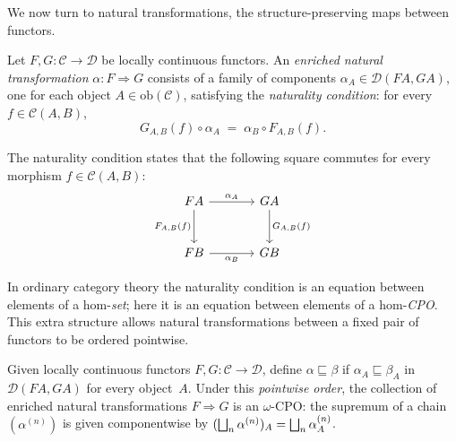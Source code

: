 We now turn to natural transformations, the structure-preserving maps
between functors.

\begin{definition}
\label{def:enriched-nat-trans}
Let $F, G : \mathcal{C} \to \mathcal{D}$ be locally continuous functors.
An \emph{enriched natural transformation} $\alpha : F \Rightarrow G$
consists of a family of components
$\alpha_A \in \mathcal{D}(FA, GA)$, one for each object
$A \in \mathrm{ob}(\mathcal{C})$, satisfying the \emph{naturality
condition}: for every $f \in \mathcal{C}(A, B)$,
\begin{equation}
\label{eq:enriched-naturality}
  G_{A,B}(f) \circ \alpha_A \;=\; \alpha_B \circ F_{A,B}(f).
\end{equation}
\end{definition}

The naturality condition states that the following square commutes for
every morphism $f \in \mathcal{C}(A, B)$:
\[
\begin{tikzcd}[column sep=large, row sep=large]
FA \arrow[r, "\alpha_A"] \arrow[d, "F_{A,B}(f)"'] &
  GA \arrow[d, "G_{A,B}(f)"] \\
FB \arrow[r, "\alpha_B"'] & GB
\end{tikzcd}
\]

In ordinary category theory the naturality condition is an equation
between elements of a hom-\emph{set}; here it is an equation between
elements of a hom-\emph{CPO}. This extra structure allows natural
transformations between a fixed pair of functors to be ordered
pointwise.

\begin{proposition}
\label{prop:nat-trans-cpo}
Given locally continuous functors $F, G : \mathcal{C} \to \mathcal{D}$,
define $\alpha \sqsubseteq \beta$ if
$\alpha_A \sqsubseteq \beta_A$ in $\mathcal{D}(FA, GA)$ for every
object~$A$. Under this \emph{pointwise order}, the collection of
enriched natural transformations $F \Rightarrow G$ is an $\omega$-CPO:
the supremum of a chain $(\alpha^{(n)})$ is given componentwise by
$(\bigsqcup_n \alpha^{(n)})_A = \bigsqcup_n \alpha^{(n)}_A$.
\end{proposition}

